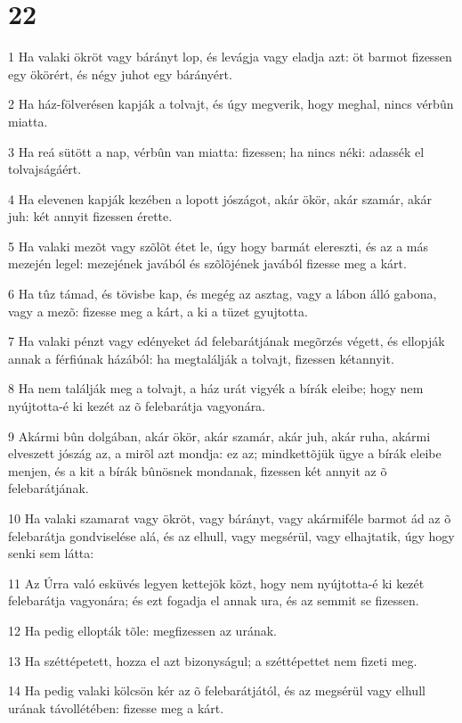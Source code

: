 \chapter{22}

\par 1 Ha valaki ökröt vagy bárányt lop, és levágja vagy eladja azt: öt barmot fizessen egy ökörért, és négy juhot egy bárányért.
\par 2 Ha ház-fölverésen kapják a tolvajt, és úgy megverik, hogy meghal, nincs vérbûn miatta.
\par 3 Ha reá sütött a nap, vérbûn van miatta: fizessen; ha nincs néki: adassék el tolvajságáért.
\par 4 Ha elevenen kapják kezében a lopott jószágot, akár ökör, akár szamár, akár juh: két annyit fizessen érette.
\par 5 Ha valaki mezõt vagy szõlõt étet le, úgy hogy barmát elereszti, és az a más mezején legel: mezejének javából és szõlõjének javából fizesse meg a kárt.
\par 6 Ha tûz támad, és tövisbe kap, és megég az asztag, vagy a lábon álló gabona, vagy a mezõ: fizesse meg a kárt, a ki a tüzet gyujtotta.
\par 7 Ha valaki pénzt vagy edényeket ád felebarátjának megõrzés végett, és ellopják annak a férfiúnak házából: ha megtalálják a tolvajt, fizessen kétannyit.
\par 8 Ha nem találják meg a tolvajt, a ház urát vigyék a bírák eleibe; hogy nem nyújtotta-é ki kezét az õ felebarátja vagyonára.
\par 9 Akármi bûn dolgában, akár ökör, akár szamár, akár juh, akár ruha, akármi elveszett jószág az, a mirõl azt mondja: ez az; mindkettõjük ügye a bírák eleibe menjen, és a kit a bírák bûnösnek mondanak, fizessen két annyit az õ felebarátjának.
\par 10 Ha valaki szamarat vagy ökröt, vagy bárányt, vagy akármiféle barmot ád az õ felebarátja gondviselése alá, és az elhull, vagy megsérül, vagy elhajtatik, úgy hogy senki sem látta:
\par 11 Az Úrra való esküvés legyen kettejök közt, hogy nem nyújtotta-é ki kezét felebarátja vagyonára; és ezt fogadja el annak ura, és az semmit se fizessen.
\par 12 Ha pedig ellopták tõle: megfizessen az urának.
\par 13 Ha széttépetett, hozza el azt bizonyságul; a széttépettet nem fizeti meg.
\par 14 Ha pedig valaki kölcsön kér az õ felebarátjától, és az megsérül vagy elhull urának távollétében: fizesse meg a kárt.
